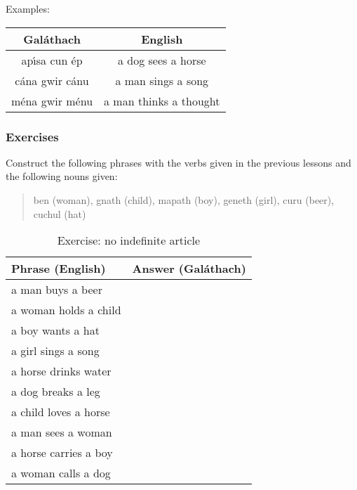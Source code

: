 Examples:
\begin{table}[H]
\centering
\begin{tabu}{c|c}
  \textbf{Gal\'{a}thach} & \textbf{English}\\
  \toprule
  ap\'{\i}sa cun \'{e}p & a dog sees a horse\\
  c\'{a}na gwir c\'{a}nu & a man sings a song\\
  m\'{e}na gwir m\'{e}nu & a man thinks a thought
\end{tabu}
\label{examples_vso_more_examples}
\end{table}

\subsubsection{Exercises}

Construct the following phrases with the verbs given in the previous lessons and the following nouns given:

\begin{quote}
ben (woman), gnath (child), mapath (boy), geneth (girl), curu (beer), cuchul (hat)
\end{quote}

\begin{table}[H]
\centering
\begin{tabu}{|l|p{10.0cm}|}
  \toprule
  \textbf{Phrase (English)} & \textbf{Answer (Gal\'{a}thach)}\\
  \toprule
  a man buys a beer & \\
  \midrule
  a woman holds a child & \\
  \midrule
  a boy wants a hat & \\
  \midrule
  a girl sings a song & \\
  \midrule
  a horse drinks water & \\
  \midrule
  a dog breaks a leg & \\
  \midrule
  a child loves a horse & \\
  \midrule
  a man sees a woman & \\
  \midrule
  a horse carries a boy & \\
  \midrule
  a woman calls a dog & \\
  \bottomrule
\end{tabu}
\label{exercises_no_indefinite_article}
\caption{Exercise: no indefinite article}
\end{table}

